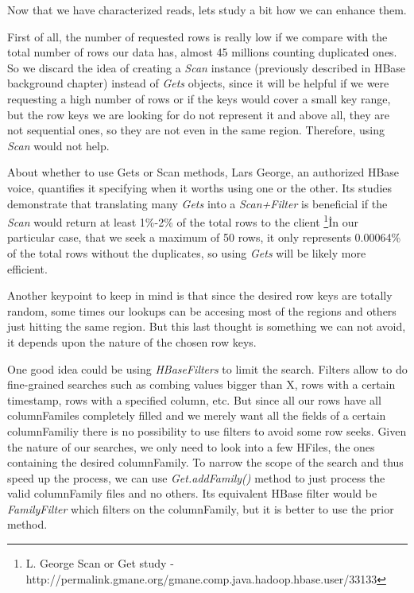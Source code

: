 Now that we have characterized reads, lets study a bit how we can enhance them. 
\par
First of all, the number of requested rows is really low if we compare with the total number of rows our data has, almost 45 millions counting duplicated ones. So we discard the idea of creating a \textit{Scan} instance (previously described in HBase background chapter) instead of \textit{Gets} objects, since it will be helpful if we were requesting a high number of rows or if the keys would cover a small key range, but the row keys we are looking for do not represent it and above all, they are not sequential ones, so they are not even in the same region. Therefore, using \textit{Scan} would not help. 
\par
About whether to use Gets or Scan methods, Lars George, an authorized HBase voice, quantifies it specifying when it worths using one or the other. Its studies demonstrate that translating many \textit{Gets} into a \textit{Scan+Filter} is beneficial if the \textit{Scan} would return at least 1\%-2\% of the total rows to the client \footnote{ L. George Scan or Get study - http://permalink.gmane.org/gmane.comp.java.hadoop.hbase.user/33133}\. In our particular case, that we seek a maximum of 50 rows, it only represents 0.00064\% of the total rows without the duplicates, so using \textit{Gets} will be likely more efficient.
\par
Another keypoint to keep in mind is that since the desired row keys are totally random, some times our lookups can be accesing most of the regions and others just hitting the same region. But this last thought is something we can not avoid, it depends upon the nature of the chosen row keys.
\par
One good idea could be using \textit{HBaseFilters} to limit the search. Filters allow to do fine-grained searches such as combing values bigger than X, rows with a certain timestamp, rows with a specified column, etc. But since all our rows have all columnFamiles completely filled and we merely want all the fields of a certain columnFamiliy there is no possibility to use filters to avoid some row seeks. Given the nature of our searches, we only need to look into a few HFiles, the ones containing the desired columnFamily. To narrow the scope of the search and thus speed up the process, we can use \textit{Get.addFamily()} method to just process the valid columnFamily files and no others. Its equivalent HBase filter would be \textit{FamilyFilter} which filters on the columnFamily, but it is better to use the prior method.
\par


